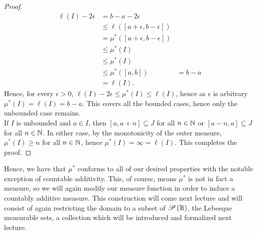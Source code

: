 \begin{proof}
	\begin{align*}
		\ell\left( I \right) - 2\epsilon &= b - a - 2\epsilon \\
						 &\le \ell \left( \left[ a + \epsilon, b - \epsilon \right]  \right) \\
						 &=  \mu^{*}\left( \left[ a + \epsilon, b - \epsilon \right]  \right)  \\
						 &\le \mu^{*}\left( I \right)\\
						 &\le \mu^{*}\left( I \right) \\
						 &\le \mu^{*}\left( \left[ a, b \right]  \right)
						 &= b -a \\
						 &= \ell\left( I \right)
	.\end{align*}
	Hence, for every \(\epsilon > 0\), \(\ell\left( I \right)  - 2\epsilon \le \mu^{*}\left( I \right)  \le \ell \left( I \right) \), hence as \(\epsilon\) is arbitrary \( \mu^{*} \left( I \right)  = \ell \left( I \right) = b-a \). This covers all the bounded cases, hence only the unbounded case remains.\\
	If \(I\) is unbounded and \(a \in I\), then \(\left[ a, a+n \right] \subseteq J\) for all \(n \in \mathbb{N}\) or \(\left[ a- n, a \right] \subseteq J\) for all \(n \in \mathbb{N}\). In either case, by the monotonicity of the outer measure,  \( \mu^{*}\left( I \right)  \ge n\) for all \(n \in \mathbb{N}\), hence \( \mu^{*}\left( I \right)  = \infty = \ell \left( I \right) \). This completes the proof.
\end{proof}
Hence, we have that \( \mu^{*}\) conforms to all of our desired properties with the notable exception of countable additivity. This, of course, means \( \mu^{*}\) is not in fact a measure, so we will again modify our measure function in order to induce a countably additive measure. This construction will come next lecture and will consist of again restricting the domain to a subset of \(\mathscr{P}\left( \mathbb{R} \right) \), the Lebesque measurable sets, a collection which will be introduced and formalized next lecture.

